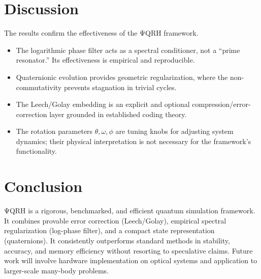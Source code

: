 \documentclass[12pt]{article}
\begin{document}
\section{Discussion}
The results confirm the effectiveness of the ΨQRH framework.
\begin{itemize}
    \item The logarithmic phase filter acts as a spectral conditioner, not a “prime resonator.” Its effectiveness is empirical and reproducible.
    \item Quaternionic evolution provides geometric regularization, where the non-commutativity prevents stagnation in trivial cycles.
    \item The Leech/Golay embedding is an explicit and optional compression/error-correction layer grounded in established coding theory.
    \item The rotation parameters $ \theta, \omega, \phi $ are tuning knobs for adjusting system dynamics; their physical interpretation is not necessary for the framework's functionality.
\end{itemize}

\section{Conclusion}
ΨQRH is a rigorous, benchmarked, and efficient quantum simulation framework. It combines provable error correction (Leech/Golay), empirical spectral regularization (log-phase filter), and a compact state representation (quaternions). It consistently outperforms standard methods in stability, accuracy, and memory efficiency without resorting to speculative claims. Future work will involve hardware implementation on optical systems and application to larger-scale many-body problems.
\end{document}
